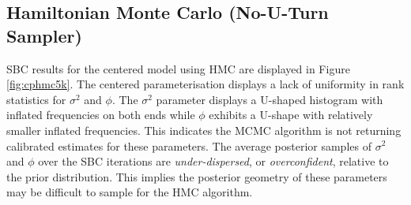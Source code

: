 \documentclass[12pt, a4paper]{article}
\begin{document}
    \subsection{Hamiltonian Monte Carlo (No-U-Turn Sampler)}
    SBC results for the centered model using HMC are displayed in Figure \ref{fig:cphmc5k}. The centered parameterisation displays a lack of uniformity in rank statistics for $\sigma^2$ and $\phi$. The $\sigma^2$ parameter displays a U-shaped histogram with inflated frequencies on both ends while $\phi$ exhibits a U-shape with relatively smaller inflated frequencies. This indicates the MCMC algorithm is not returning calibrated estimates for these parameters. The average posterior samples of $\sigma^2$ and $\phi$ over the SBC iterations are \textit{under-dispersed}, or \textit{overconfident}, relative to the prior distribution. This implies the posterior geometry of these parameters may be difficult to sample for the HMC algorithm.
\end{document}
